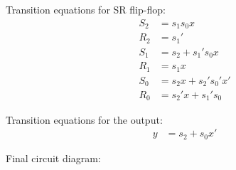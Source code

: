 \documentclass[12pt, a4paper]{article}
\begin{document}
	Transition equations for SR flip-flop:
	\begin{equation}
		\begin{aligned}
			S_2 &= s_1s_0x \\
			R_2 &= s_1' \\
			S_1 &= s_2 + s_1's_0x \\
			R_1 &= s_1x \\
			S_0 &= s_2x + s_2's_0'x' \\
			R_0 &= s_2'x + s_1's_0
		\end{aligned}
	\end{equation}
	
	Transition equations for the output:
	\begin{equation}
		\begin{aligned}
			y &= s_2 + s_0x'
		\end{aligned}
	\end{equation}

	
	Final circuit diagram:
	\begin{center}
	\end{center}
	
\end{document}
